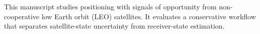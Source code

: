 This manuscript studies positioning with signals of opportunity from non-cooperative low Earth orbit (LEO) satellites. It evaluates a conservative workflow that separates satellite-state uncertainty from receiver-state estimation.
